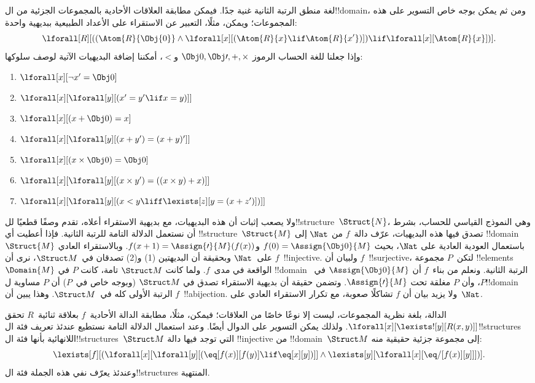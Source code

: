\documentclass[../../../include/open-logic-section]{subfiles}
\begin{document}
لغة منطق الرتبة الثانية غنية جدًا. فيمكن مطابقة العلاقات الأحادية
بالمجموعات الجزئية من ال!!{domain}، ومن ثم يمكن بوجه خاص التسوير على
هذه المجموعات؛ ويمكن، مثلًا، التعبير عن الاستقراء على الأعداد الطبيعية
ببديهية واحدة:
\[
\lforall[R][((\Atom{R}{\Obj{0}} \land \lforall[x][(\Atom{R}{x} \lif
    \Atom{R}{x'})]) \lif \lforall[x][\Atom{R}{x}])].
\]
وإذا جعلنا للغة الحساب الرموز $\Obj 0, \Obj \prime, +,
\times$ و$<$، أمكننا إضافة البديهيات الآتية لوصف سلوكها:
\begin{enumerate}
\item $\lforall[x][\lnot x' = \Obj 0]$
\item $\lforall[x][\lforall[y][(x' = y' \lif x = y)]]$
\item $\lforall[x][(x + \Obj 0) = x]$
\item $\lforall[x][\lforall[y][(x + y') = (x + y)']]$
\item $\lforall[x][(x \times \Obj 0) = \Obj 0]$
\item $\lforall[x][\lforall[y][(x \times y') = ((x \times y) + x)]]$
\item $\lforall[x][\lforall[y][(x < y \liff \lexists[z][y = (x + z')])]]$
\end{enumerate}
ولا يصعب إثبات أن هذه البديهيات، مع بديهية الاستقراء أعلاه، تقدم وصفًا
قطعيًا لل!!{structure}~$\Struct{N}$، وهي النموذج القياسي للحساب، بشرط
أن نستعمل الدلالة التامة للرتبة الثانية. فإذا أعطيت أي
!!{structure}~$\Struct{M}$ تصدق فيها هذه البديهيات، عرّف دالة~$f$ من
$\Nat$ إلى !!{domain}~$\Struct{M}$ باستعمال العودية العادية على
$\Nat$، بحيث $f(0) = \Assign{\Obj 0}{M}$ و$f(x+1) =
\Assign{\prime}{M}(f(x))$. وبالاستقراء العادي على~$\Nat$ وبحقيقة أن
البديهتين (1) و(2) تصدقان في~$\Struct M$، نرى أن $f$~!!{injective}.
ولبيان أن $f$~!!{surjective}، لتكن~$P$ مجموعة !!{element}s~$\Domain{M}$
الواقعة في مدى~$f$. ولما كانت $\Struct M$ تامة، كانت $P$ في
!!{domain} الرتبة الثانية. ونعلم من بناء~$f$ أن $\Assign{\Obj
  0}{M}$ في~$P$، وأن $P$ مغلقة تحت $\Assign{\prime}{M}$. وتضمن حقيقة
أن بديهية الاستقراء تصدق في $\Struct M$ (وبوجه خاص في~$P$) أن
$P$ مساوية ل!!{domain} الرتبة الأولى كله في~$\Struct M$. وهذا يبين أن
$f$~!!a{bijection}. ولا يزيد بيان أن $f$ تشاكلًا صعوبة، مع تكرار
الاستقراء العادي على~$\Nat$.

الدالة، بلغة نظرية المجموعات، ليست إلا نوعًا خاصًا من العلاقات؛ فيمكن،
مثلًا، مطابقة الدالة الأحادية~$f$ بعلاقة ثنائية~$R$ تحقق
$\lforall[x][\lexists![y][R(x,y)]]$. ولذلك يمكن التسوير على الدوال
أيضًا. وعند استعمال الدلالة التامة نستطيع عندئذ تعريف فئة
ال!!{structure}s اللانهائية بأنها فئة ال!!{structure}s~$\Struct M$
التي توجد فيها دالة !!{injective} من !!{domain}~$\Struct M$ إلى
مجموعة جزئية حقيقية منه:
\[
\lexists[f][(\lforall[x][\lforall[y][(\eq[f(x)][f(y)] \lif \eq[x][y])]]
  \land \lexists[y][\lforall[x][\eq/[f(x)][y]]])].
\]
وعندئذ يعرّف نفي هذه الجملة فئة ال!!{structure}s المنتهية.
\end{document}
